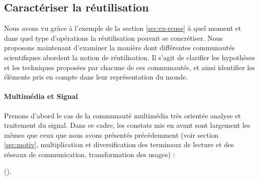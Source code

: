 




\subsection{Caractériser la réutilisation}\label{sec:reuse}
Nous avons vu grâce à l'exemple de la section \ref{sec:ex-reuse} à quel moment et dans quel type d'opérations la réutilisation pouvait se concrétiser. 
Nous proposons maintenant d'examiner la manière dont différentes communautés scientifiques  abordent la notion de réutilisation. 
Il s'agit de clarifier les hypothèses et les techniques proposées par chacune de ces communautés, et ainsi identifier les éléments pris en compte dans leur représentation du monde.  %

\paragraph{Multimédia et Signal}
Prenons d'abord le cas de la communauté multimédia très orientée analyse et traitement du signal. 
Dans ce cadre, les constats mis en avant sont largement les mêmes que ceux que nous avons présentés précédemment (voir section \ref{sec:motiv}, multiplication et diversification des terminaux de lecture et des réseaux de communication, transformation des usages) :
 
 (\cite{Singh2004}).

